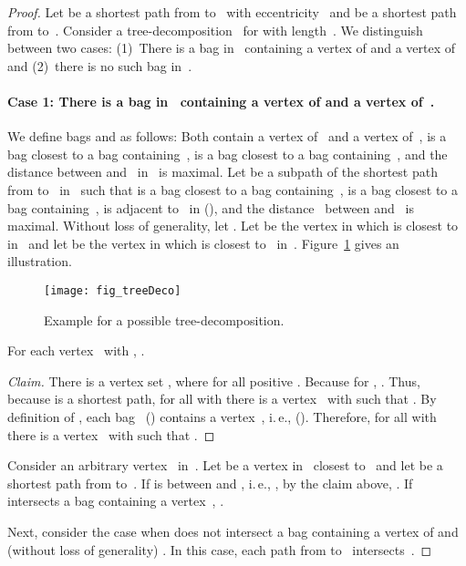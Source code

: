 \documentclass[10pt]{llncs}
\makeatletter
\newcommand{\ie}{i.\,e.\@ifnextchar{,}{}{~}}
\DeclareRobustCommand{\qedClaim}
{\ifmmode \lozenge \else \leavevmode\unskip\penalty9999 \hbox{}\nobreak\hfill \quad\hbox{}\fi }
\makeatother
\begin{document}
\begin{proof}
Let  be a shortest path from  to~ with eccentricity~ and  be a shortest path from  to~.
Consider a tree-decomposition~ for  with length~.
We distinguish between two cases:
(1)~There is a bag in~ containing a vertex of  and a vertex of  and (2)~there is no such bag in~.

\paragraph{Case 1: There is a bag in~ containing a vertex of  and a vertex of~.}
We define bags  and  as follows:
Both contain a vertex of~ and a vertex of~,  is a bag closest to a bag containing~,  is a bag closest to a bag containing~, and the distance between  and~ in~ is maximal.
Let  be a subpath of the shortest path from  to~ in~ such that  is a bag closest to a bag containing~,  is a bag closest to a bag containing~,  is adjacent to~ in  (), and the distance~ between  and~ is maximal.
Without loss of generality, let .
Let  be the vertex in  which is closest to~ in~ and let  be the vertex in  which is closest to~ in~.
Figure~\ref{fig:TreeDecoEg} gives an illustration.

\begin{figure}
    [htb]
    \centering
    \texttt{[image: fig\_treeDeco]}\caption
    {
        Example for a possible tree-decomposition.
    }
    \label{fig:TreeDecoEg}
\end{figure}

\begin{claim}
For each vertex~ with , .
\end{claim}

\begin{proof}
    [Claim]
There is a vertex set , where  for all positive .
Because  for , .
Thus, because  is a shortest path, for all  with  there is a vertex~ with  such that .
By definition of , each bag~ () contains a vertex~, \ie,  ().
Therefore, for all  with  there is a vertex~ with  such that .
\qedClaim
\end{proof}

Consider an arbitrary vertex~ in~.
Let  be a vertex in~ closest to~ and let  be a shortest path from  to~.
If  is between  and , \ie, , by the claim above, .
If  intersects a bag containing a vertex~, .

Next, consider the case when  does not intersect a bag containing a vertex of  and (without loss of generality) .
In this case, each path from  to~ intersects~.


\end{proof}
\end{document}
